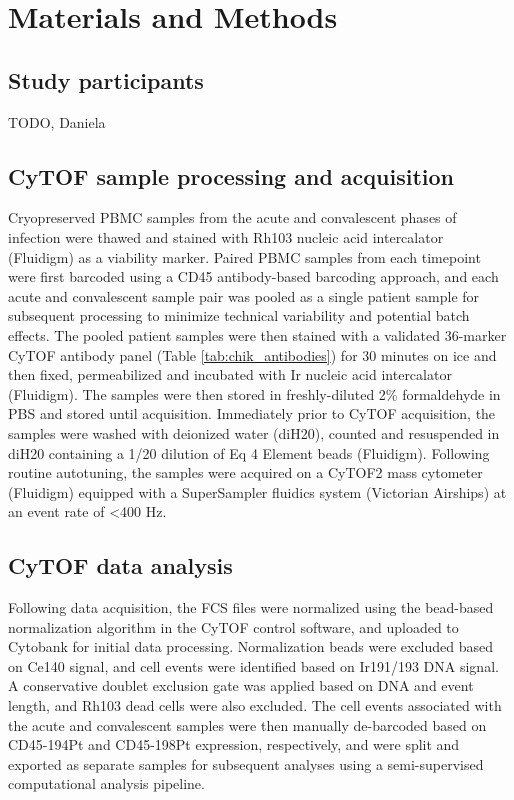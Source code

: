 \section{Materials and Methods}

\subsection{Study participants}

TODO, Daniela

\subsection{CyTOF sample processing and acquisition}

Cryopreserved PBMC samples from the acute and convalescent phases of infection were thawed and stained with Rh103 nucleic acid intercalator (Fluidigm) as a viability marker. Paired PBMC samples from each timepoint were first barcoded using a CD45 antibody-based barcoding approach,\autocite{Mei2016} and each acute and convalescent sample pair was pooled as a single patient sample for subsequent processing to minimize technical variability and potential batch effects. The pooled patient samples were then stained with a validated 36-marker CyTOF antibody panel (Table \ref{tab:chik_antibodies}) for 30 minutes on ice and then fixed, permeabilized and incubated with Ir nucleic acid intercalator (Fluidigm). The samples were then stored in freshly-diluted 2\% formaldehyde in PBS and stored until acquisition. Immediately prior to CyTOF acquisition, the samples were washed with deionized water (diH20), counted and resuspended in diH20 containing a 1/20 dilution of Eq 4 Element beads (Fluidigm). Following routine autotuning, the samples were acquired on a CyTOF2 mass cytometer (Fluidigm) equipped with a SuperSampler fluidics system (Victorian Airships) at an event rate of <400 Hz. 

\subsection{CyTOF data analysis}

Following data acquisition, the FCS files were normalized using the bead-based normalization algorithm in the CyTOF control software, and uploaded to Cytobank for initial data processing. Normalization beads were excluded based on Ce140 signal, and cell events were identified based on Ir191/193 DNA signal. A conservative doublet exclusion gate was applied based on DNA and event length, and Rh103\sups{+} dead cells were also excluded. The cell events associated with the acute and convalescent samples were then manually de-barcoded based on CD45-194Pt and CD45-198Pt expression, respectively, and were split and exported as separate samples for subsequent analyses using a semi-supervised computational analysis pipeline. 

